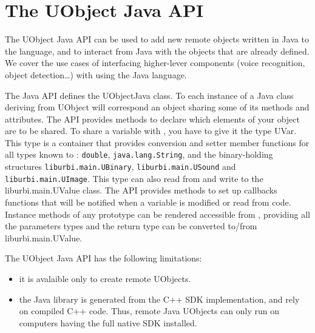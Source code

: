 

\chapter{The UObject Java API}
\label{sec:uob:apijava}

The UObject Java API can be used to add new remote objects written in Java
to the \us language, and to interact from Java with the objects that are
already defined. We cover the use cases of interfacing higher-lever components
(voice recognition, object detection\ldots) with \urbi using the Java language.

The Java API defines the UObjectJava class. To each instance of a Java class
deriving from UObject will correspond an \us object sharing some of its
methods and attributes. The API provides methods to declare which elements
of your object are to be shared. To share a variable with \urbi, you have to
give it the type UVar. This type is a container that provides conversion and
setter member functions for all types known to \urbi: \lstinline{double},
\lstinline{java.lang.String}, and the binary-holding structures
\lstinline{liburbi.main.UBinary}, \lstinline{liburbi.main.USound} and
\lstinline{liburbi.main.UImage}. This type can also read from and write to
the liburbi.main.UValue class. The API provides methods to set up callbacks
functions that will be notified when a variable is modified or read from
\urbi code. Instance methods of any prototype can be rendered accessible
from \us, providing all the parameters types and the return type can be
converted to/from liburbi.main.UValue.

The UObject Java API has the following limitations:
\begin{itemize}
\item it is avalaible only to create remote UObjects.
\item the Java library is generated from the C++ SDK implementation, and rely
on compiled C++ code. Thus, remote Java UObjects can only run on computers
having the full \urbi native SDK installed.
\end{itemize}

